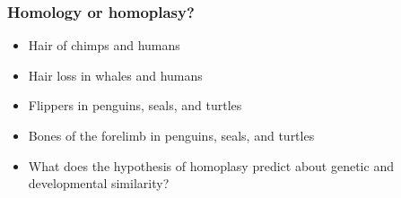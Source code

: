     
\begin{frame}
    \frametitle{Homology or homoplasy?}
    \begin{adjustwidth}{-1.5em}{-1.5em}
    \begin{itemize}
        \item Hair of chimps and humans


            \vspace{3mm}
        \item Hair loss in whales and humans


            \vspace{3mm}
        \item Flippers in penguins, seals, and turtles


            \vspace{3mm}
        \item Bones of the forelimb in penguins, seals, and turtles



            \vspace{3mm}
        \item What does the hypothesis of homoplasy predict about genetic and
            developmental similarity?

    \end{itemize}
    \end{adjustwidth}
\end{frame}

